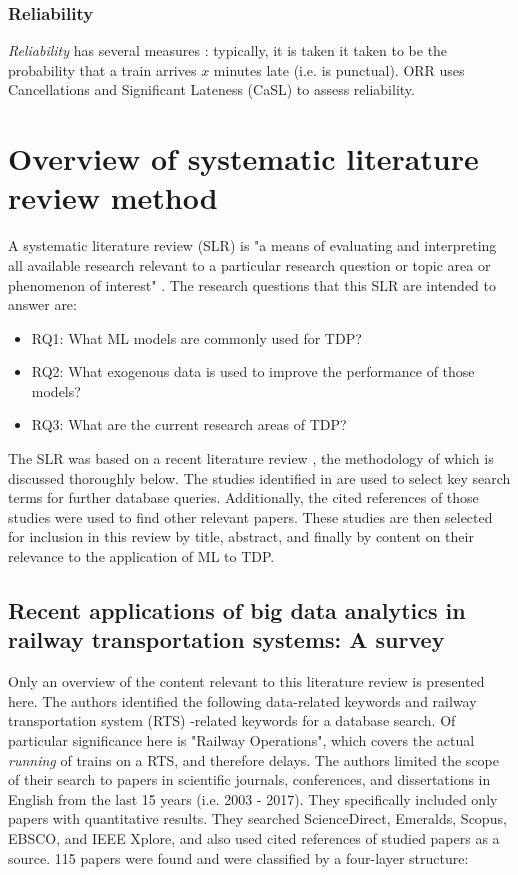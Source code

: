 \documentclass{article}
\begin{document}
\subsubsection{Reliability}

\textit{Reliability} has several measures \cite{rietveld_bruinsma_van_vuuren_2001}: typically, it is taken it taken to be the probability that a train arrives $x$ minutes late (i.e. is punctual). ORR uses Cancellations and Significant Lateness (CaSL) to assess reliability.

\clearpage
\section{Overview of systematic literature review method}

A systematic literature review (SLR) is "a means of evaluating and interpreting all available research relevant to a particular research question or topic area or phenomenon of interest" \cite{williams_hollingsworth_2005}. The research questions that this SLR are intended to answer are:

\begin{itemize}
	\item RQ1: What ML models are commonly used for TDP?
	\item RQ2: What exogenous data is used to improve the performance of those models?
	\item RQ3: What are the current research areas of TDP?
\end{itemize}

The SLR was based on a recent literature review \cite{ghofrani_et_al_2018}, the methodology of which is discussed thoroughly below. The studies identified in \cite{ghofrani_et_al_2018} are used to select key search terms for further database queries. Additionally, the cited references of those studies were used to find other relevant papers. These studies are then selected for inclusion in this review by title, abstract, and finally by content on their relevance to the application of ML to TDP.

\subsection{Recent applications of big data analytics in railway transportation systems: A survey \cite{ghofrani_et_al_2018}}

Only an overview of the content relevant to this literature review is presented here.
The authors identified the following data-related keywords and railway transportation system (RTS) -related keywords for a database search. Of particular significance here is "Railway Operations", which covers the actual \textit{running} of trains on a RTS, and therefore delays. The authors limited the scope of their search to papers in scientific journals, conferences, and dissertations in English from the last 15 years (i.e. 2003 - 2017). They specifically included only papers with quantitative results. They searched ScienceDirect, Emeralds, Scopus, EBSCO, and IEEE Xplore, and also used cited references of studied papers as a source. 115 papers were found and were classified by a four-layer structure:
\end{document}
